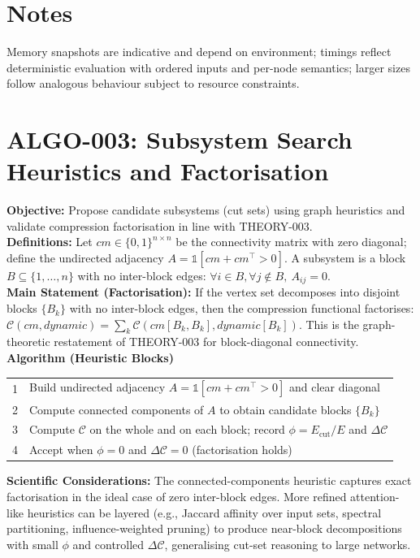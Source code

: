 \documentclass[11pt]{article}
\begin{document}
\section{Notes}
Memory snapshots are indicative and depend on environment; timings reflect deterministic evaluation with ordered inputs and per-node semantics; larger sizes follow analogous behaviour subject to resource constraints.

\section{ALGO-003: Subsystem Search Heuristics and Factorisation}
\textbf{Objective:} Propose candidate subsystems (cut sets) using graph heuristics and validate compression factorisation in line with THEORY-003.\\
\textbf{Definitions:} Let \(cm\in\{0,1\}^{n\times n}\) be the connectivity matrix with zero diagonal; define the undirected adjacency \(A=\mathbb{1}[cm+cm^\top>0]\). A subsystem is a block \(B\subseteq\{1,\dots,n\}\) with no inter-block edges: \(\forall i\in B,\forall j\notin B,\ A_{ij}=0\).\\
\textbf{Main Statement (Factorisation):} If the vertex set decomposes into disjoint blocks \(\{B_k\}\) with no inter-block edges, then the compression functional factorises: \(\mathcal{C}(cm, dynamic)=\sum_k \mathcal{C}(cm[B_k,B_k], dynamic[B_k])\). This is the graph-theoretic restatement of THEORY-003 for block-diagonal connectivity.\\
\textbf{Algorithm (Heuristic Blocks)}\\
\begin{center}
\begin{tabular}{ll}
\toprule
\midrule
1 & Build undirected adjacency \(A=\mathbb{1}[cm+cm^\top>0]\) and clear diagonal \\
2 & Compute connected components of \(A\) to obtain candidate blocks \(\{B_k\}\) \\
3 & Compute \(\mathcal{C}\) on the whole and on each block; record \(\phi=E_{\mathrm{cut}}/E\) and \(\Delta \mathcal{C}\) \\
4 & Accept when \(\phi=0\) and \(\Delta \mathcal{C}=0\) (factorisation holds) \\
\bottomrule
\end{tabular}
\end{center}
\textbf{Scientific Considerations:} The connected-components heuristic captures exact factorisation in the ideal case of zero inter-block edges. More refined attention-like heuristics can be layered (e.g., Jaccard affinity over input sets, spectral partitioning, influence-weighted pruning) to produce near-block decompositions with small \(\phi\) and controlled \(\Delta \mathcal{C}\), generalising cut-set reasoning to large networks.\\
\end{document}
